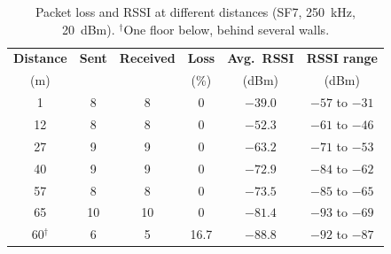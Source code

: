 \documentclass[informe,english]{plantilla}
\begin{document}
\begin{table}[htbp]
    \centering
    \begin{tabular}{@{}cccccc@{}}
        \toprule
        \textbf{Distance} & \textbf{Sent} & \textbf{Received} & \textbf{Loss} & \textbf{Avg.\ RSSI} & \textbf{RSSI range} \\
        (m) & & & (\%) & (dBm) & (dBm) \\
        \midrule
        1  & 8  & 8  & 0    & $-39.0$ & $-57$ to $-31$ \\
        12 & 8  & 8  & 0    & $-52.3$ & $-61$ to $-46$ \\
        27 & 9  & 9  & 0    & $-63.2$ & $-71$ to $-53$ \\
        40 & 9  & 9  & 0    & $-72.9$ & $-84$ to $-62$ \\
        57 & 8  & 8  & 0    & $-73.5$ & $-85$ to $-65$ \\
        65 & 10 & 10 & 0    & $-81.4$ & $-93$ to $-69$ \\
        \midrule
        60$^{\dagger}$ & 6 & 5 & 16.7 & $-88.8$ & $-92$ to $-87$ \\
        \bottomrule
    \end{tabular}
    \caption{Packet loss and RSSI at different distances (SF7, 250~kHz, 20~dBm). $^{\dagger}$One floor below, behind several walls.}
    \label{tab:qos-results}
\end{table}
\end{document}
